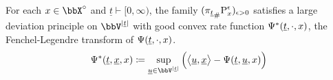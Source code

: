 \begin{theorem}
  \label{theorem:fdds}
  For each $\stateVar \in \stateSpace^\circ$ and $\underline t \vdash [0,\infty)$, the family $(\push{\Prb^\epsilon_\stateVar}{\pi_{\underline t}})_{\epsilon>0}$ satisfies a large deviation principle on $\vecSpace^{|\underline t|}$ with good convex rate function $\aff^*(\underline t, \cdot, \stateVar)$, the Fenchel-Legendre transform of $\aff(\underline t, \cdot, \stateVar)$.
  \begin{equation*}
    \aff^*(\underline t, \underline\stateVar, \stateVar) \defeq \sup_{\underline\momentVar \in \vecSpace^{|\underline t|}} \Big( \bprj{\underline\momentVar}{\underline\stateVar} - \aff(\underline t, \underline\momentVar, \stateVar) \Big)
  \end{equation*}
\end{theorem}
